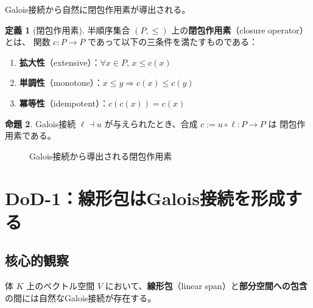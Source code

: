 \documentclass[a4paper,11pt]{ltjsarticle}
\theoremstyle{definition}
\newtheorem{definition}{定義}[section]
\newtheorem{proposition}[definition]{命題}
\begin{document}
Galois接続から自然に閉包作用素が導出される。

\begin{definition}[閉包作用素]
  半順序集合 $(P, \leq)$ 上の\textbf{閉包作用素}（closure operator）とは、
  関数 $c : P \to P$ であって以下の三条件を満たすものである：
  \begin{enumerate}
    \item \textbf{拡大性}（extensive）：$\forall x \in P,\, x \leq c(x)$
    \item \textbf{単調性}（monotone）：$x \leq y \Rightarrow c(x) \leq c(y)$
    \item \textbf{冪等性}（idempotent）：$c(c(x)) = c(x)$
  \end{enumerate}
\end{definition}

\begin{proposition}
  Galois接続 $\ell \dashv u$ が与えられたとき、合成 $c := u \circ \ell : P \to P$ は
  閉包作用素である。
\end{proposition}

\begin{figure}[htbp]
  \centering
  \caption{Galois接続から導出される閉包作用素}
  \label{fig:closure-from-gc}
\end{figure}

\section{DoD-1：線形包はGalois接続を形成する}

\subsection{核心的観察}

体 $K$ 上のベクトル空間 $V$ において、\textbf{線形包}（linear span）と\textbf{部分空間への包含}
の間には自然なGalois接続が存在する。
\end{document}
